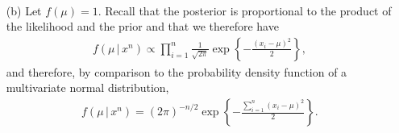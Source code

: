 \begin{ex}~
  \inputminted{python}{../code/11-02.py}
  \inputminted{text}{../output/11-02.txt}

  \begin{enumerate}[(a)]
    \item[(b)] Let $f(\mu)=1$. Recall that the posterior is proportional to the
          product of the likelihood and the prior and that we therefore have
          \begin{align*}
            f(\mu\,|\,x^n)\propto \prod_{i=1}^n\frac{1}{\sqrt{2\pi}}
            \exp\left\{-\frac{(x_i-\mu)^2}{2}\right\},
          \end{align*}
          and therefore, by comparison to the probability density function of a
          multivariate normal distribution,
          \begin{align*}
            f(\mu\,|\,x^n)=
            (2\pi)^{-n/2}
            \exp\left\{-\frac{\sum_{i=1}^n(x_i-\mu)^2}{2}\right\}.
          \end{align*}


\end{enumerate}
\end{ex}
